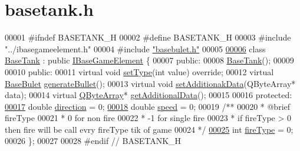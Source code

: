 \hypertarget{a00041_source}{}\section{basetank.\+h}
\label{a00041_source}

\begin{DoxyCode}
00001 \textcolor{preprocessor}{#}\textcolor{preprocessor}{ifndef} \textcolor{preprocessor}{BASETANK\_H}
00002 \textcolor{preprocessor}{#}\textcolor{preprocessor}{define} \textcolor{preprocessor}{BASETANK\_H}
00003 \textcolor{preprocessor}{#}\textcolor{preprocessor}{include} \textcolor{preprocessor}{"../ibasegameelement.h"}
00004 \textcolor{preprocessor}{#}\textcolor{preprocessor}{include} \hyperlink{a00035}{"basebulet.h"}
00005 
\hyperlink{a00157}{00006} \textcolor{keyword}{class} \hyperlink{a00157}{BaseTank} : \textcolor{keyword}{public} \hyperlink{a00137_ae2be75da1a2a9edfabe993770e24654a}{IBaseGameElement} \{
00007  \textcolor{keyword}{public}:
00008   \hyperlink{a00157_ab09f29abaec12417480cae3a5f900a41}{BaseTank}();
00009 
00010  \textcolor{keyword}{public}:
00011   \textcolor{keyword}{virtual} \textcolor{keywordtype}{void} \hyperlink{a00157_a455ad8853248e1976e9d817eb55f102a}{setType}(\textcolor{keywordtype}{int} value) \textcolor{keyword}{override};
00012   \textcolor{keyword}{virtual} \hyperlink{a00153}{BaseBulet} \hyperlink{a00157_a901c01a2908f900b4cd45e791d27b0d3}{generateBullet}();
00013   \textcolor{keyword}{virtual} \textcolor{keywordtype}{void} \hyperlink{a00157_a7e61943b1d601b7ff3206857f5198e66}{setAdditionakData}(QByteArray* data);
00014   \textcolor{keyword}{virtual} \hyperlink{a00157_aeecdd72e10d3996ee6c72c59f8bf69d8}{QByteArray}* \hyperlink{a00157_aeecdd72e10d3996ee6c72c59f8bf69d8}{getAdditionalData}();
00015 
00016  \textcolor{keyword}{protected}:
\hyperlink{a00157_a647e1404ae554cb46d9168f988e05e9e}{00017}   \textcolor{keywordtype}{double} \hyperlink{a00157_a647e1404ae554cb46d9168f988e05e9e}{direction} = 0;
\hyperlink{a00157_a075d8661441062552aa5fb22f88ab023}{00018}   \textcolor{keywordtype}{double} \hyperlink{a00157_a075d8661441062552aa5fb22f88ab023}{speed} = 0;
00019   \textcolor{comment}{/**}
00020 \textcolor{comment}{   * @brief fireType}
00021 \textcolor{comment}{   * 0  for non fire}
00022 \textcolor{comment}{   * -1 for single fire}
00023 \textcolor{comment}{   * if fireType > 0 then fire will be call evry fireType tik of game}
00024 \textcolor{comment}{   */}
\hyperlink{a00157_a927e84e94d984793d55d0048b123ae15}{00025}   \textcolor{keywordtype}{int} \hyperlink{a00157_a927e84e94d984793d55d0048b123ae15}{fireType} = 0;
00026 \};
00027 
00028 \textcolor{preprocessor}{#}\textcolor{preprocessor}{endif}  \textcolor{comment}{// BASETANK\_H}
\end{DoxyCode}
